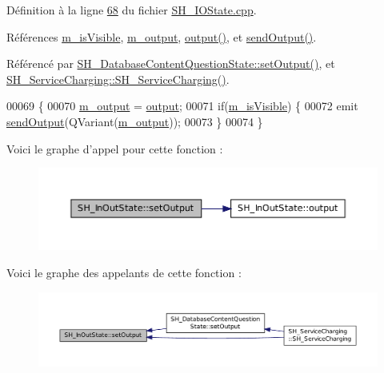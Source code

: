 Définition à la ligne \hyperlink{SH__IOState_8cpp_source_l00068}{68} du fichier \hyperlink{SH__IOState_8cpp_source}{S\-H\-\_\-\-I\-O\-State.\-cpp}.



Références \hyperlink{classSH__InOutState_a8fd66b185c9a55f0e84daa97e2acf53a}{m\-\_\-is\-Visible}, \hyperlink{classSH__InOutState_ae735e741ce229d2600448d8daa0abc2d}{m\-\_\-output}, \hyperlink{classSH__InOutState_a1a2fd4f34484125058e20730aaee7e46}{output()}, et \hyperlink{classSH__InOutState_ad40e929a5537eb1d4883d5aa6eee5b15}{send\-Output()}.



Référencé par \hyperlink{classSH__DatabaseContentQuestionState_aff932cdd7974baeea9a477cf0abc5ace}{S\-H\-\_\-\-Database\-Content\-Question\-State\-::set\-Output()}, et \hyperlink{classSH__ServiceCharging_afa5273d046049b1c2b020a6a19a8290b}{S\-H\-\_\-\-Service\-Charging\-::\-S\-H\-\_\-\-Service\-Charging()}.


\begin{DoxyCode}
00069 \{
00070     \hyperlink{classSH__InOutState_ae735e741ce229d2600448d8daa0abc2d}{m\_output} = \hyperlink{classSH__InOutState_a1a2fd4f34484125058e20730aaee7e46}{output};
00071     \textcolor{keywordflow}{if}(\hyperlink{classSH__InOutState_a8fd66b185c9a55f0e84daa97e2acf53a}{m\_isVisible}) \{
00072         emit \hyperlink{classSH__InOutState_ad40e929a5537eb1d4883d5aa6eee5b15}{sendOutput}(QVariant(\hyperlink{classSH__InOutState_ae735e741ce229d2600448d8daa0abc2d}{m\_output}));
00073     \}
00074 \}
\end{DoxyCode}


Voici le graphe d'appel pour cette fonction \-:\nopagebreak
\begin{figure}[H]
\begin{center}
\leavevmode
\includegraphics[width=350pt]{classSH__InOutState_a7dc244d72e09fdbc30eb3a704b05a4d8_cgraph}
\end{center}
\end{figure}




Voici le graphe des appelants de cette fonction \-:\nopagebreak
\begin{figure}[H]
\begin{center}
\leavevmode
\includegraphics[width=350pt]{classSH__InOutState_a7dc244d72e09fdbc30eb3a704b05a4d8_icgraph}
\end{center}
\end{figure}


